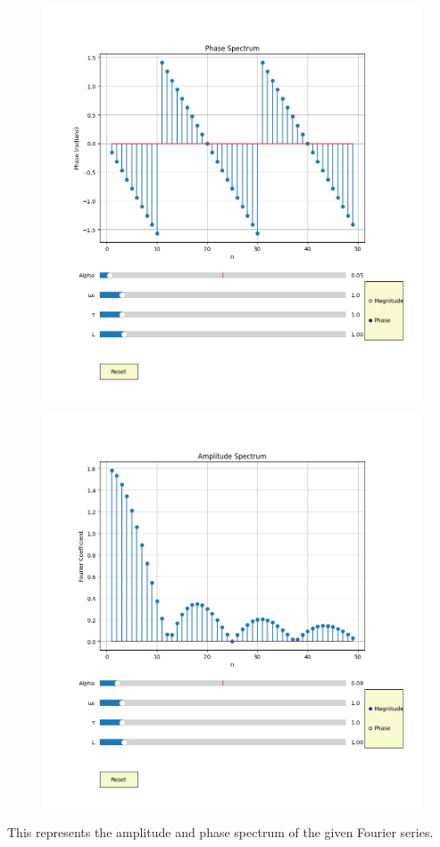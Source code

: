 \documentclass[12pt,a4paper]{report}
\begin{document}
\begin{figure}[h!]
    \centering
    \includegraphics[width=0.7\linewidth]{figs/phase_spectrum.png}
    \label{fig:enter-label}
\end{figure}
\begin{figure}[h!]
    \centering
    \includegraphics[width=1\linewidth]{figs/amplitude_spectrum.png}
    \label{fig:enter-label}
\end{figure}
This represents the amplitude and phase spectrum of the given Fourier series.
\end{document}

